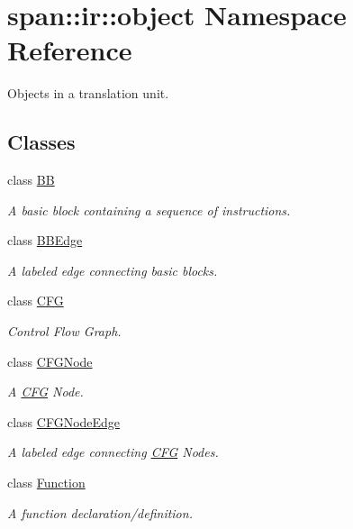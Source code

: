 \hypertarget{namespacespan_1_1ir_1_1object}{}\section{span\+:\+:ir\+:\+:object Namespace Reference}
\label{namespacespan_1_1ir_1_1object}


Objects in a translation unit.  


\subsection*{Classes}
\begin{DoxyCompactItemize}
\item 
class \hyperlink{classspan_1_1ir_1_1object_1_1BB}{BB}
\begin{DoxyCompactList}\small\item\em A basic block containing a sequence of instructions. \end{DoxyCompactList}\item 
class \hyperlink{classspan_1_1ir_1_1object_1_1BBEdge}{B\+B\+Edge}
\begin{DoxyCompactList}\small\item\em A labeled edge connecting basic blocks. \end{DoxyCompactList}\item 
class \hyperlink{classspan_1_1ir_1_1object_1_1CFG}{C\+FG}
\begin{DoxyCompactList}\small\item\em Control Flow Graph. \end{DoxyCompactList}\item 
class \hyperlink{classspan_1_1ir_1_1object_1_1CFGNode}{C\+F\+G\+Node}
\begin{DoxyCompactList}\small\item\em A \hyperlink{classspan_1_1ir_1_1object_1_1CFG}{C\+FG} Node. \end{DoxyCompactList}\item 
class \hyperlink{classspan_1_1ir_1_1object_1_1CFGNodeEdge}{C\+F\+G\+Node\+Edge}
\begin{DoxyCompactList}\small\item\em A labeled edge connecting \hyperlink{classspan_1_1ir_1_1object_1_1CFG}{C\+FG} Nodes. \end{DoxyCompactList}\item 
class \hyperlink{classspan_1_1ir_1_1object_1_1Function}{Function}
\begin{DoxyCompactList}\small\item\em A function declaration/definition. \end{DoxyCompactList}\end{DoxyCompactItemize}
